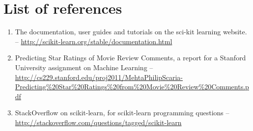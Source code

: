 \documentclass[a4paper,12pt]{article}
\begin{document}
 
\section{List of references}

\begin{enumerate}
	\item The documentation, user guides and tutorials on the  sci-kit learning website. -- \url{http://scikit-learn.org/stable/documentation.html}
	\item \label{ref:movie-reviews} Predicting Star Ratings of Movie Review Comments, a report for a Stanford University assignment on Machine Learning -- \url{http://cs229.stanford.edu/proj2011/MehtaPhilipScaria-Predicting%20Star%20Ratings%20from%20Movie%20Review%20Comments.pdf}
	\item StackOverflow on scikit-learn, for scikit-learn programming questions -- \url{http://stackoverflow.com/questions/tagged/scikit-learn}
\end{enumerate}
\end{document}
